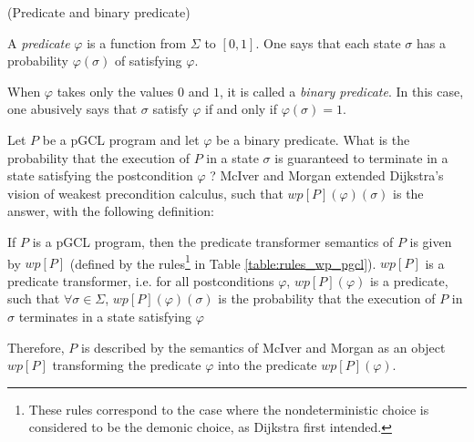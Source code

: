 \documentclass[a4paper,10pt]{llncs}
\begin{document}
	\begin{definition}{\textnormal{(Predicate and binary predicate)}}
	\item A \emph{predicate} $\varphi$ is a function from $\Sigma$ to $[0,1]$. One says that each state $\sigma$ has a probability $\varphi(\sigma)$ of satisfying $\varphi$.
	\item When $\varphi$ takes only the values $0$ and $1$, it is called a \emph{binary predicate}. In this case, one abusively says that $\sigma$ satisfy $\varphi$ if and only if $\varphi(\sigma) = 1$.
	\end{definition}

    Let $P$ be a pGCL program and let $\varphi$ be a binary predicate.
	What is the probability that the execution of $P$ in a state $\sigma$ is guaranteed to terminate in a state satisfying the postcondition $\varphi$ ? McIver and Morgan extended Dijkstra's vision of weakest precondition calculus, such that $wp[P](\varphi)(\sigma)$ is the answer, with the following definition:
	\begin{definition}
	If $P$ is a pGCL program, then the predicate transformer semantics of $P$ is given by $wp[P]$ (defined by the rules\footnote{These rules correspond to the case where the nondeterministic choice is considered to be the demonic choice, as Dijkstra first intended.} in Table \ref{table:rules_wp_pgcl}).\newline
	$wp[P]$ is a predicate transformer, i.e. for all postconditions $\varphi$, $wp[P](\varphi)$ is a predicate, such that $\forall \sigma \in \Sigma$, $wp[P](\varphi)(\sigma)$ is the probability that the execution of $P$ in $\sigma$ terminates in a state satisfying $\varphi$
	\end{definition}
	Therefore, $P$ is described by the semantics of McIver and Morgan as an object $wp[P]$ transforming the predicate $\varphi$ into the predicate $wp[P](\varphi)$.
	
\end{document}
